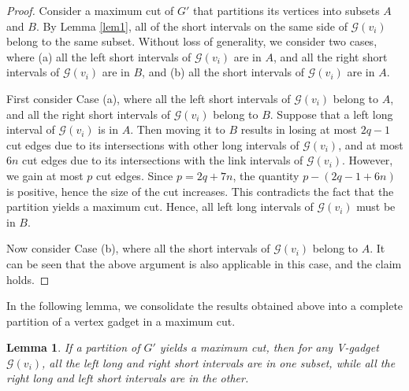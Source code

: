 \documentclass[11pt]{article}
\newtheorem{lemma}{Lemma}
\begin{document}
\begin{proof}
 Consider a maximum cut of $G'$ that partitions its vertices into subsets $A$ and $B$. By Lemma \ref{lem1}, all of the short intervals on the same side of $\mathcal{G}(v_i)$ belong to the same subset. Without loss of generality, we consider two cases, where (a) all the left short intervals of $\mathcal{G}(v_i)$ are in $A$, and all the right short intervals of $\mathcal{G}(v_i)$ are in $B$, and (b) all the short intervals of $\mathcal{G}(v_i)$ are in $A$.
 
First consider Case (a), where all the left short intervals of $\mathcal{G}(v_i)$ belong to $A$, and all the right short intervals of $\mathcal{G}(v_i)$ belong to $B$. Suppose that a left long interval of $\mathcal{G}(v_i)$ is in $A$. Then moving it to $B$ results in losing at most $2q-1$ cut edges due to its intersections with other long intervals of $\mathcal{G}(v_i)$, and at most $6n$ cut edges due to its intersections with the link intervals of $\mathcal{G}(v_i)$.
However, we gain at most $p$ cut edges. Since $p=2q+7n$, the quantity $p-(2q-1+6n)$ is positive, hence the size of the cut increases. This contradicts the fact that the partition yields a maximum cut. Hence, all left long intervals of $\mathcal{G}(v_i)$ must be in $B$.

Now consider Case (b), where all the short intervals of $\mathcal{G}(v_i)$ belong to $A$. It can be seen that the above argument is also applicable in this case, and the claim holds. 
\end{proof}

In the following lemma, we consolidate the results obtained above into a complete partition of a vertex gadget in a maximum cut.

\begin{lemma} \label{lem3}
If a partition of $G'$ yields a maximum cut, then for any V-gadget $\mathcal{G}(v_i)$, all the left long and right short intervals are in one subset, while all the right long and left short intervals are in the other.

\end{lemma}
\end{document}
